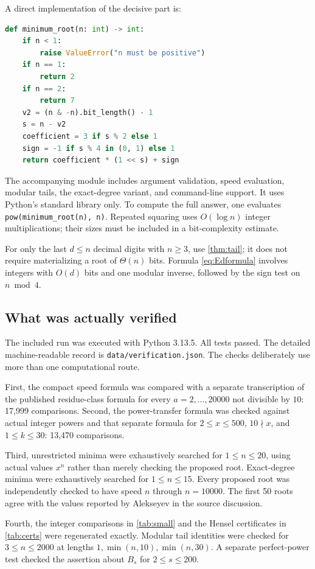 \documentclass[11pt,a4paper]{article}
\theoremstyle{definition}
\begin{document}
A direct implementation of the decisive part is:
\begin{lstlisting}[language=Python]
def minimum_root(n: int) -> int:
    if n < 1:
        raise ValueError("n must be positive")
    if n == 1:
        return 2
    if n == 2:
        return 7
    v2 = (n & -n).bit_length() - 1
    s = n - v2
    coefficient = 3 if s % 2 else 1
    sign = -1 if s % 4 in (0, 1) else 1
    return coefficient * (1 << s) + sign
\end{lstlisting}
The accompanying module includes argument validation, speed evaluation,
modular tails, the exact-degree variant, and command-line support.
It uses Python's standard library only. To compute the full answer,
one evaluates \texttt{pow(minimum\_root(n), n)}. Repeated squaring uses
$O(\log n)$ integer multiplications; their sizes must be included in a
bit-complexity estimate.

For only the last $d\le n$ decimal digits with $n\ge3$, use
\cref{thm:tail}; it does not require materializing a root of $\Theta(n)$
bits. Formula \eqref{eq:Edformula} involves integers with $O(d)$ bits and
one modular inverse, followed by the sign test on $n\bmod4$.

\subsection{What was actually verified}
The included run was executed with Python 3.13.5. All tests passed.
The detailed machine-readable record is \texttt{data/verification.json}.
The checks deliberately use more than one computational route.

First, the compact speed formula was compared with a separate
transcription of the published residue-class formula for every
$a=2,\ldots,20000$ not divisible by $10$: 17,999 comparisons.
Second, the power-transfer formula was checked against actual integer
powers and that separate formula for $2\le x\le500$, $10\nmid x$,
and $1\le k\le30$: 13,470 comparisons.

Third, unrestricted minima were exhaustively searched for
$1\le n\le20$, using actual values $x^n$ rather than merely checking
the proposed root. Exact-degree minima were exhaustively searched for
$1\le n\le15$. Every proposed root was independently checked to have
speed $n$ through $n=10000$. The first 50 roots agree with the values
reported by Alekseyev in the source discussion.

Fourth, the integer comparisons in \cref{tab:small} and the Hensel
certificates in \cref{tab:certs} were regenerated exactly. Modular tail
identities were checked for $3\le n\le2000$ at lengths
$1,\min(n,10),\min(n,30)$. A separate perfect-power test checked the
assertion about $B_s$ for $2\le s\le200$.
\end{document}
